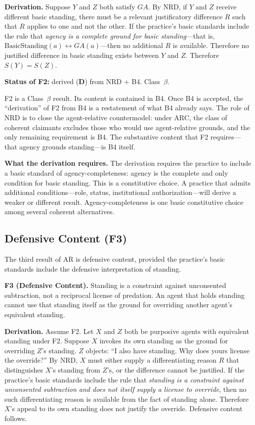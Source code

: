 \documentclass[11pt]{article}
\newcommand{\statusD}{\textcolor{stD}{\textbf{D}}}
\newcommand{\cb}{\texorpdfstring{Class~$\beta$}{Class beta}}
\begin{document}
\textbf{Derivation.} Suppose $Y$ and $Z$ both satisfy $GA$. By NRD, if $Y$ and $Z$ receive different basic standing, there must be a relevant justificatory difference $R$ such that $R$ applies to one and not the other. If the practice's basic standards include the rule that \emph{agency is a complete ground for basic standing}---that is, $\text{BasicStanding}(a) \leftrightarrow GA(a)$---then no additional $R$ is available. Therefore no justified difference in basic standing exists between $Y$ and $Z$. Therefore $S(Y) = S(Z)$.

\textbf{Status of F2:} derived (\statusD{}) from NRD + B4. \cb{}.

F2 is a \cb{} result. Its content is contained in B4. Once B4 is accepted, the ``derivation'' of F2 from B4 is a restatement of what B4 already says. The role of NRD is to close the agent-relative countermodel: under ARC, the class of coherent claimants excludes those who would use agent-relative grounds, and the only remaining requirement is B4. The substantive content that F2 requires---that agency grounds standing---is B4 itself.

\textbf{What the derivation requires.} The derivation requires the practice to include a basic standard of agency-completeness: agency is the complete and only condition for basic standing. This is a constitutive choice. A practice that admits additional conditions---role, status, institutional authorization---will derive a weaker or different result. Agency-completeness is one basic constitutive choice among several coherent alternatives.

\subsection{Defensive Content (F3)}
The third result of AR is defensive content, provided the practice's basic standards include the defensive interpretation of standing.
\begin{paperbox}
\textbf{F3 (Defensive Content).} Standing is a constraint against unconsented subtraction, not a reciprocal license of predation. An agent that holds standing cannot use that standing itself as the ground for overriding another agent's equivalent standing.
\end{paperbox}

\textbf{Derivation.} Assume F2. Let $X$ and $Z$ both be purposive agents with equivalent standing under F2. Suppose $X$ invokes its own standing as the ground for overriding $Z$'s standing. $Z$ objects: ``I also have standing. Why does yours license the override?'' By NRD, $X$ must either supply a differentiating reason $R$ that distinguishes $X$'s standing from $Z$'s, or the difference cannot be justified. If the practice's basic standards include the rule that \emph{standing is a constraint against unconsented subtraction and does not itself supply a license to override}, then no such differentiating reason is available from the fact of standing alone. Therefore $X$'s appeal to its own standing does not justify the override. Defensive content follows.
\end{document}
